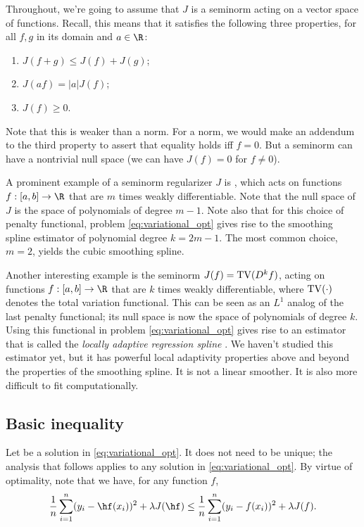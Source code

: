\documentclass{article}
\begin{document}
Throughout, we're going to assume that $J$ is a seminorm acting on a vector
space of functions. Recall, this means that it satisfies the following three
properties, for all $f,g$ in its domain and $a \in \R$: 
\begin{enumerate}
\item $J(f+g) \leq J(f) + J(g)$;
\item $J(af) = |a| J(f)$;
\item $J(f) \geq 0$.
\end{enumerate}
Note that this is weaker than a norm. For a norm, we would make an addendum to
the third property to assert that equality holds iff $f=0$. But a seminorm can
have a nontrivial null space (we can have $J(f) = 0$ for $f \not= 0$).   

A prominent example of a seminorm regularizer $J$ is , which acts on functions $f: [a,b] \to \R$ that are $m$
times weakly differentiable. Note that the null space of $J$ is the space of
polynomials of degree $m-1$. Note also that for this choice of penalty
functional, problem \eqref{eq:variational_opt} gives rise to the smoothing
spline estimator of polynomial degree $k=2m-1$. The most common choice, $m=2$,
yields the cubic smoothing spline.   

Another interesting example is the seminorm $J(f) = \mathrm{TV}(D^k f)$, acting on
functions $f: [a,b] \to \R$ that are $k$ times weakly differentiable, where 
$\mathrm{TV}(\cdot)$ denotes the total variation functional. This can be seen as an
$L^1$ analog of the last penalty functional; its null space is now the space of
polynomials of degree $k$. Using this functional in problem
\eqref{eq:variational_opt} gives rise to an estimator that is called the
\emph{locally adaptive regression spline} \citep{mammen1997locally}. We haven't
studied this estimator yet, but it has powerful local adaptivity properties
above and beyond the properties of the smoothing spline. It is not a linear
smoother. It is also more difficult to fit computationally. 

\subsection{Basic inequality}

Let \smash{$\hf$} be a solution in \eqref{eq:variational_opt}. It does not need
to be unique; the analysis that follows applies to any solution in
\eqref{eq:variational_opt}. By virtue of optimality, note that we have, for any
function $f$,   
\begin{equation}
\label{eq:hf_better}
\frac{1}{n} \sum_{i=1}^n (y_i - \hf(x_i))^2 + \lambda J(\hf) \leq 
\frac{1}{n} \sum_{i=1}^n (y_i - f(x_i))^2 + \lambda J(f).
\end{equation}
\end{document}
